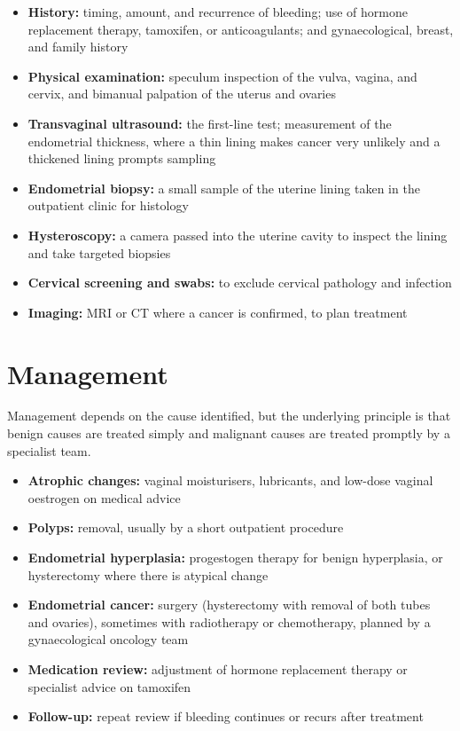 \begin{itemize}
    \item \textbf{History:} timing, amount, and recurrence of bleeding; use of hormone replacement therapy, tamoxifen, or anticoagulants; and gynaecological, breast, and family history
    \item \textbf{Physical examination:} speculum inspection of the vulva, vagina, and cervix, and bimanual palpation of the uterus and ovaries
    \item \textbf{Transvaginal ultrasound:} the first-line test; measurement of the endometrial thickness, where a thin lining makes cancer very unlikely and a thickened lining prompts sampling
    \item \textbf{Endometrial biopsy:} a small sample of the uterine lining taken in the outpatient clinic for histology
    \item \textbf{Hysteroscopy:} a camera passed into the uterine cavity to inspect the lining and take targeted biopsies
    \item \textbf{Cervical screening and swabs:} to exclude cervical pathology and infection
    \item \textbf{Imaging:} MRI or CT where a cancer is confirmed, to plan treatment
\end{itemize}

\section*{Management}
Management depends on the cause identified, but the underlying principle is that benign causes are treated simply and malignant causes are treated promptly by a specialist team.

\begin{itemize}
    \item \textbf{Atrophic changes:} vaginal moisturisers, lubricants, and low-dose vaginal oestrogen on medical advice
    \item \textbf{Polyps:} removal, usually by a short outpatient procedure
    \item \textbf{Endometrial hyperplasia:} progestogen therapy for benign hyperplasia, or hysterectomy where there is atypical change
    \item \textbf{Endometrial cancer:} surgery (hysterectomy with removal of both tubes and ovaries), sometimes with radiotherapy or chemotherapy, planned by a gynaecological oncology team
    \item \textbf{Medication review:} adjustment of hormone replacement therapy or specialist advice on tamoxifen
    \item \textbf{Follow-up:} repeat review if bleeding continues or recurs after treatment
\end{itemize}

